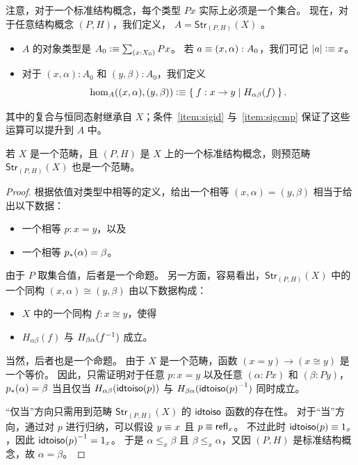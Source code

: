 注意，对于一个标准结构概念，每个类型 $Px$ 实际上必须是一个集合。
现在，对于任意结构概念 $(P,H)$，我们定义，
%
%
$A = \mathsf{Str}_{(P,H)}(X)$
。

\begin{itemize}
\item $A$ 的对象类型是 $A_0 \defeq \sm{x:X_0} Px$。
  若 $a\equiv (x,\alpha):A_0$，我们可记 $|a| \vcentcolon\equiv x$。
\item 对于 $(x,\alpha):A_0$ 和 $(y,\beta):A_0$，我们定义
  \[\hom_A((x,\alpha),(y,\beta)) \vcentcolon\equiv \Set{ f:x \to y | H_{\alpha\beta}(f)}.\]
\end{itemize}

其中的复合与恒同态射继承自 $X$；条件~\ref{item:sigid} 与~\ref{item:sigcmp} 保证了这些运算可以提升到 $A$ 中。

\begin{thm}[结构同一性原理]\label{thm:sip}
  若 $X$ 是一个范畴，且 $(P,H)$ 是 $X$ 上的一个标准结构概念，则预范畴 $\mathsf{Str}_{(P,H)}(X)$ 也是一个范畴。
\end{thm}

\begin{proof}
  根据依值对类型中相等的定义，给出一个相等 $(x,\alpha)=(y,\beta)$ 相当于给出以下数据：
  \begin{itemize}
  \item 一个相等 $p:x=y$，以及
  \item 一个相等 ${p}_{*}\mathopen{}\left({\alpha}\right)\mathclose{}=\beta$。
  \end{itemize}
  由于 $P$ 取集合值，后者是一个命题。
另一方面，容易看出，$\mathsf{Str}_{(P,H)}(X)$ 中的一个同构 $(x,\alpha)\cong (y,\beta)$ 由以下数据构成：
  \begin{itemize}
  \item $X$ 中的一个同构 $f:x\cong y$，使得
  \item $H_{\alpha\beta}(f)$ 与 $H_{\beta\alpha}({f}^{-1})$ 成立。
  \end{itemize}
  当然，后者也是一个命题。
由于 $X$ 是一个范畴，函数 $(x=y) \to (x\cong y)$ 是一个等价。
因此，只需证明对于任意 $p:x=y$ 以及任意 $(\alpha:Px)$ 和 $(\beta:Py)$，${p}_{*}\mathopen{}\left({\alpha}\right)\mathclose{}=\beta$ 当且仅当 $H_{\alpha\beta}(\mathsf{idtoiso} (p))$ 与 $H_{\beta\alpha}({\mathsf{idtoiso}(p)}^{-1})$ 同时成立。

  “仅当”方向只需用到范畴 $\mathsf{Str}_{(P,H)}(X)$ 的 $\mathsf{idtoiso}$ 函数的存在性。
对于“当”方向，通过对 $p$ 进行归纳，可以假设 $y\equiv x$ 且 $p\equiv\mathsf{refl}_{x}$。
不过此时 $\mathsf{idtoiso} (p)\equiv 1_x$，因此 ${\mathsf{idtoiso}(p)}^{-1}=1_x$。
于是 $\alpha\leq_x \beta$ 且 $\beta\leq_x \alpha$，又因 $(P,H)$ 是标准结构概念，故 $\alpha=\beta$。
\end{proof}

